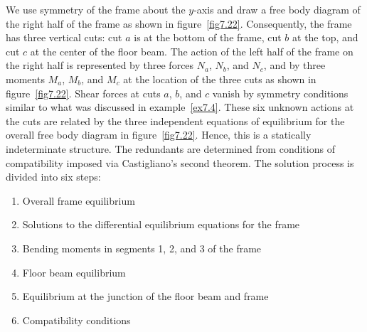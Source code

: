 \documentclass{AeroStructure-ERJohnson}
\begin{document}
\begin{example}\label{ex7.7}We use symmetry of the frame about the $y$-axis and draw a free body diagram of the right half of the frame as shown in figure~\ref{fig7.22}. Consequently, the frame has three vertical cuts: cut $a$ is at the bottom of the frame, cut $b$ at the top, and cut $c$ at the center of the floor beam. The action of the left half of the frame on the right half is represented by three forces $N_{a}$, $N_{b}$, and $N_{c}$, and by three moments $M_{a}$, $M_{b}$, and $M_{c}$ at the location of the three cuts as shown in figure~\ref{fig7.22}. Shear forces at cuts $a$, $b$, and $c$ vanish by symmetry conditions similar to what was discussed in example~\ref{ex7.4}. These six unknown actions at the cuts are related by the three independent equations of equilibrium for the overall free body diagram in figure~\ref{fig7.22}. Hence, this is a statically indeterminate structure. The redundants are determined from conditions of compatibility imposed via Castigliano's second theorem. The solution process is divided into six steps:
\begin{enumerate}
\item Overall frame equilibrium
\item Solutions to the differential equilibrium equations for the frame
\item Bending moments in segments 1, 2, and 3 of the frame
\item Floor beam equilibrium
\item Equilibrium at the junction of the floor beam and frame
\item Compatibility conditions
\end{enumerate}

{\def\thefigure{7.22}
\vspace*{-2\baselineskip}
}
\vspace*{-2\baselineskip}


\end{example}
\end{document}
